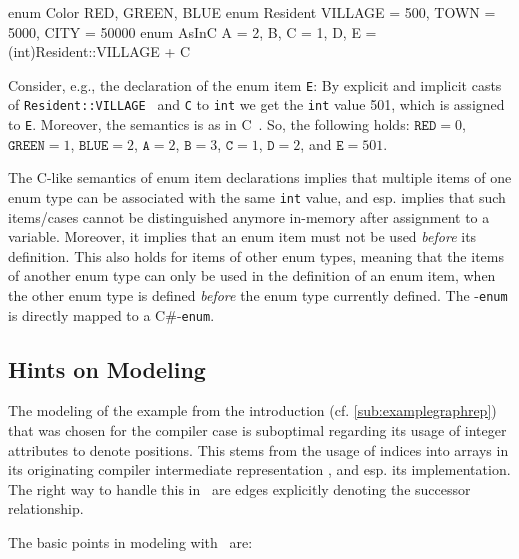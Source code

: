 \begin{example}
\begin{grgen}
enum Color {RED, GREEN, BLUE}
enum Resident {VILLAGE = 500, TOWN = 5000, CITY = 50000}
enum AsInC {A = 2, B, C = 1, D, E = (int)Resident::VILLAGE + C}
\end{grgen}
Consider, e.g., the declaration of the enum item {\tt E}:
By explicit and implicit casts of {\tt Resident::VILLAGE } and {\tt C} to {\tt int} we get the {\tt int} value 501, which is assigned to {\tt E}.
Moreover, the semantics is as in C~\cite{Sch:1990:ANSIC}. So, the following holds: $\texttt{RED} = 0$, $\texttt{GREEN} = 1$, $\texttt{BLUE} = 2$, $\texttt{A}=2$, $\texttt{B}=3$, $\texttt{C}=1$, $\texttt{D}=2$, and $\texttt{E}=501$.
\end{example}

\begin{note}
	The C-like semantics of enum item declarations implies that multiple items of one enum type can be associated with the same {\tt int} value, and esp. implies that such items/cases cannot be distinguished anymore in-memory after assignment to a variable.
	Moreover, it implies that an enum item must not be used \emph{before} its definition.
	This also holds for items of other enum types, meaning that the items of another enum type can only be used in the definition of an enum item, when the other enum type is defined \emph{before} the enum type currently defined.
	The \GrG{}-\texttt{enum} is directly mapped to a C\#-\texttt{enum}.
\end{note}


\subsection{Hints on Modeling}\label{modelcontainsnext}

The modeling of the example from the introduction (cf. \ref{sub:examplegraphrep}) that was chosen for the compiler case\cite{CompilerCase} is suboptimal regarding its usage of integer attributes to denote positions.
This stems from the usage of indices into arrays in its originating compiler intermediate representation \Firm, and esp. its implementation.
The right way to handle this in \GrG\ are edges explicitly denoting the successor relationship.

The basic points in modeling with \GrG\ are:

